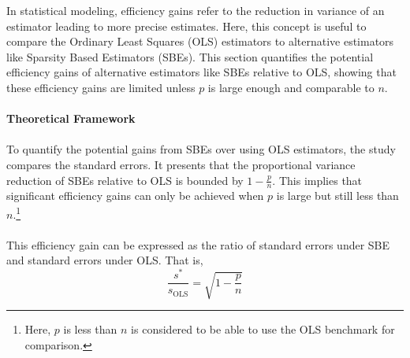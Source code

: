In statistical modeling, efficiency gains refer to the reduction in variance of an estimator leading to more precise estimates. Here, this concept is useful to compare the Ordinary Least Squares (OLS) estimators to alternative estimators like Sparsity Based Estimators (SBEs). This section quantifies the potential efficiency gains of alternative estimators like SBEs relative to OLS, showing that these efficiency gains are limited unless $p$ is large enough and comparable to $n$. \\
\\
\textbf{Theoretical Framework}\\
\\
To quantify the potential gains from SBEs over using OLS estimators, the study compares the standard errors. It presents that the proportional variance reduction of SBEs relative to OLS is bounded by $1- \frac{p}{n}$. This implies that significant efficiency gains can only be achieved when $p$ is large but still less than $n$.\footnote{Here, $p$ is less than $n$ is considered to be able to use the OLS benchmark for comparison.}\\
\\
This efficiency gain can be expressed as the ratio of standard errors under SBE and standard errors under OLS. That is, \\
\begin{equation}
    \frac{s^*}{s_{\text{OLS}}} = \sqrt{1 - \frac{p}{n}}
\end{equation}

